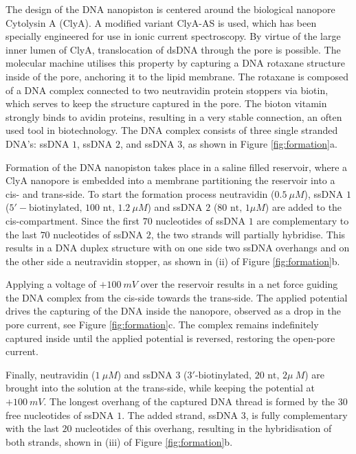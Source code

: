 The design of the DNA nanopiston is centered around the biological nanopore Cytolysin
A (ClyA). A modified variant ClyA-AS is used, which has been specially engineered for
use in ionic current spectroscopy.\cite{Soskine2012} By virtue of the large inner lumen
of ClyA,
translocation of dsDNA through the pore is possible. The molecular machine utilises this
property by capturing a DNA rotaxane structure inside of the pore, anchoring it to the
lipid membrane. The rotaxane is composed of a DNA complex connected to two neutravidin
protein stoppers via biotin, which serves to keep the structure captured in the pore.
The bioton vitamin strongly binds to avidin proteins, resulting in a very stable
connection, an often used tool in biotechnology. The DNA complex consists of three single
stranded DNA's:  ssDNA $1$, ssDNA $2$, and ssDNA $3$, as shown in Figure
\ref{fig:formation}a.

Formation of the DNA nanopiston takes place in a saline filled reservoir, where a
ClyA nanopore is embedded into a membrane partitioning the reservoir into a cis- and
trans-side. To start the formation process neutravidin ($0.5\ \mu M$), ssDNA $1$
($5′-\text{biotinylated, }100\text{ nt, }1.2\ \mu M$) and ssDNA $2$ ($80\text{ nt, }1
\mu M$) are added to the cis-compartment. Since the first $70$ nucleotides of ssDNA $1$
are complementary to the last $70$ nucleotides of ssDNA $2$, the two strands will
partially hybridise. This results in a DNA duplex structure with on one side two ssDNA
overhangs and on the other side a neutravidin stopper, as shown in (ii) of Figure
\ref{fig:formation}b.

Applying a voltage of $+100\ mV$ over the reservoir results in a net force guiding the
DNA complex from the cis-side towards the trans-side. The applied potential drives the
capturing of the DNA inside the nanopore, observed as a drop in the pore current, see
Figure \ref{fig:formation}c. The complex remains indefinitely captured inside until the
applied potential is reversed, restoring the open-pore current.

Finally, neutravidin ($1\ \mu M$) and ssDNA $3$ ($3\text{′-biotinylated, }20\text{ nt, }2
\mu\ M$) are brought into the solution at the trans-side, while keeping the potential at
$+ 100\ mV$. The longest overhang of the captured DNA thread is formed by the 30 free
nucleotides of ssDNA $1$. The added strand, ssDNA $3$, is fully complementary with the
last $20$ nucleotides of this overhang, resulting in the hybridisation of both strands,
shown in (iii) of Figure \ref{fig:formation}b.

